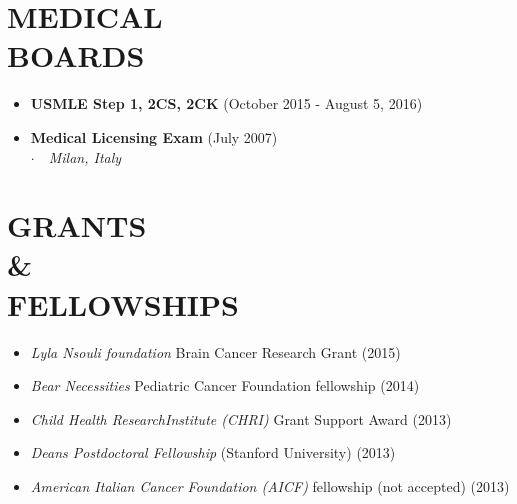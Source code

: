 \documentclass[line,margin]{res}
\newcommand{\titlestyle}[1]{{\bf #1}}
\newcommand{\placestyle}[1]{\footnotesize $\cdot$\ \ {\emph{#1}}}
\newcommand{\datestyle}[1]{{\tiny \dotfill} {\small (#1)}}
\begin{document}
\begin{resume}
\section{MEDICAL \\ BOARDS}
\begin{itemize}
\item {
  \titlestyle {USMLE Step 1, 2CS, 2CK} \datestyle{October 2015 - August 5, 2016}
}
\item {
  \titlestyle {Medical Licensing Exam} \datestyle{July 2007} \\
  { \placestyle{Milan, Italy} }
}
\end{itemize}

\section{GRANTS \\ \& \\ FELLOWSHIPS}
\begin{itemize}
  \item \emph{Lyla Nsouli foundation} Brain Cancer Research Grant \datestyle{2015}
  \item \emph{Bear Necessities} Pediatric Cancer Foundation fellowship \datestyle{2014}
  \item \emph{Child Health ResearchInstitute (CHRI)} Grant Support Award \datestyle{2013}
  \item \emph{Deans Postdoctoral Fellowship} (Stanford University) \datestyle{2013}
  \item \emph{American Italian Cancer Foundation (AICF)} fellowship (not accepted) \datestyle{2013}
\end{itemize}

\newpage

\end{resume}
\end{document}
